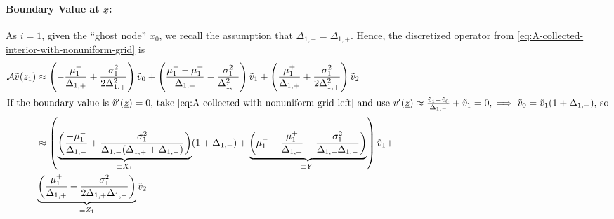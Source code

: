 \documentclass[11pt]{article}
\begin{document}
\paragraph{Boundary Value at $\underline{x}$:}
As $i =1$, given the ``ghost node'' $x_0$, we recall the assumption that $\Delta_{1,-} = \Delta_{1,+}$.  Hence, the discretized operator from \cref{eq:A-collected-interior-with-nonuniform-grid} is
\begin{align}
\mathcal{A} \tilde{v}(z_1) &\approx \left(-\frac{\mu_1^{-}}{\Delta_{1,+}} +\frac{\sigma_1^2}{2 \Delta_{1,+}^2}\right)\tilde{v}_0 + \left(\frac{\mu_1^{-} - \mu_1^{+}}{\Delta_{1,+}}-\frac{\sigma_1^2}{\Delta_{1,+}^2}\right) \tilde{v}_1 + \left(\frac{\mu_1^{+}}{\Delta_{1,+}} + \frac{\sigma_1^2}{2 \Delta_{1,+}^2}\right)\tilde{v}_2\label{eq:A-collected-with-nonuniform-grid-left}\\
\intertext{If the boundary value is $\tilde{v}'(\underline{z}) = 0$, take \cref{eq:A-collected-with-nonuniform-grid-left} and use $v'(\underline{z}) \approx \frac{\tilde{v}_1-\tilde{v}_0}{\Delta_{1,-}} +\tilde{v}_1= 0, \implies \tilde{v}_0 = \tilde{v}_1(1+\Delta_{1,-})$, so}
 &\approx \left(\underbrace{\left(\frac{-\mu_1^{-}}{\Delta_{1,-}} +\frac{\sigma_1^2}{\Delta_{1,-}(\Delta_{1,+}+\Delta_{1,-})}\right)}_{\equiv X_1}(1+\Delta_{1,-}) + \underbrace{\left(\mu_1^{-} - \frac{\mu_1^{+}}{\Delta_{1,+}}-\frac{\sigma_1^2}{\Delta_{1,+}\Delta_{1,-}}\right)}_{\equiv Y_1}\right)\tilde{v}_1 + \nonumber\\
 & \underbrace{\left(\frac{\mu_1^{+}}{\Delta_{1,+}} + \frac{\sigma_1^2}{2 \Delta_{1,+}\Delta_{1,-}}\right)}_{\equiv Z_1}\tilde{v}_2\label{eq:reflecting-left-nonuniform}
\end{align}
\end{document}
